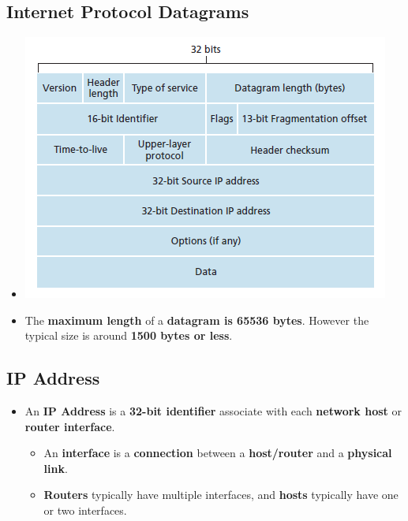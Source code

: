 \documentclass{article}
\begin{document}
    \section*{}

    \subsection*{Internet Protocol Datagrams}
    \begin{itemize}
        \item[] \begin{center} \includegraphics*[]{images/Internet-Protocol-Datagram.png} \end{center}
        \item The \textbf{maximum length} of a \textbf{datagram is 65536 bytes}. However the typical size is around \textbf{1500 bytes or less}.
    \end{itemize}

    \subsection*{IP Address}
    \begin{itemize}
        \item An \textbf{IP Address} is a \textbf{32-bit identifier} associate with each \textbf{network host} or \textbf{router interface}.
        \begin{itemize}
            \item An \textbf{interface} is a \textbf{connection} between a \textbf{host/router} and a \textbf{physical link}.
            \item \textbf{Routers} typically have multiple interfaces, and \textbf{hosts} typically have one or two interfaces.
        \end{itemize}
    \end{itemize}
\end{document}
